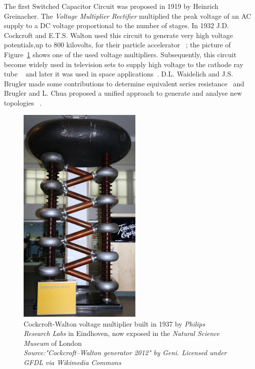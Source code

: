 The first Switched Capacitor Circuit was proposed in 1919 by Heinrich Greinacher. The \emph{Voltage Multiplier Rectifier}
multiplied the peak voltage of an AC supply to a DC voltage proportional to the number of stages. In 1932 J.D. Cockcroft and E.T.S. Walton used this circuit to generate very high voltage potentials,up to 800 kilovolts, for their particle accelerator ~\cite{30Cockcroft}; the picture of Figure~\ref{fig:Cockcroft_VMR} shows one of the used voltage multipliers. Subsequently, this circuit become widely used in television sets to supply high voltage to the cathode ray tube ~\cite{70Buechel} and later it was used in space applications~\cite{86Weinberg}. D.L. Waidelich and J.S. Brugler made some contributions to determine equivalent series resistance~\cite{44Waidelich,71Brugler} and Brugler and L. Chua proposed a unified approach to generate and analyse new topologies
~\cite{71Brugler,77Lin}.

\begin{figure}[!h]
\centering
 \includegraphics[width=6cm]{./1_modeling/img/CockcroftWaltonGenerator.jpg}
\caption{Cockcroft-Walton voltage multiplier built in 1937 by \emph{Philips Research Labs} in Eindhoven, now exposed in the \emph{Natural Science Museum} of London\\
\emph{Source:"Cockcroft–Walton generator 2012" by Geni. Licensed under GFDL via Wikimedia Commons  %
}}
\label{fig:Cockcroft_VMR}
\end{figure}


